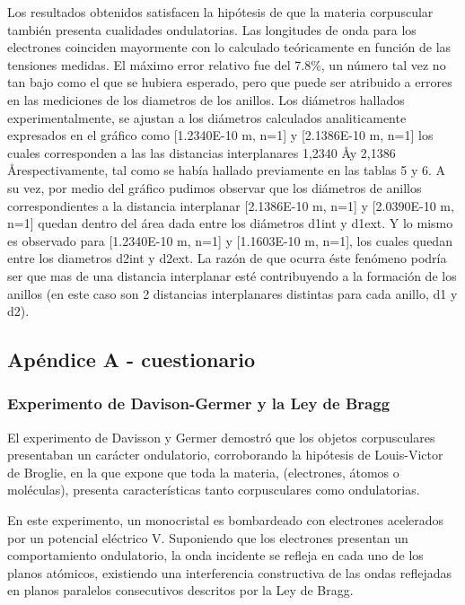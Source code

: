 \documentclass[]{article}
\begin{document}
Los resultados obtenidos satisfacen la hipótesis de que la materia
corpuscular también presenta cualidades ondulatorias. Las longitudes de
onda para los electrones coinciden mayormente con lo calculado teóricamente en
función de las tensiones medidas. El máximo error relativo fue del
7.8\%, un número tal vez no tan bajo como el que se hubiera esperado, pero 
que puede ser atribuido a errores en las mediciones de los diametros de los
anillos. Los diámetros hallados experimentalmente, se ajustan a los 
diámetros calculados analiticamente expresados en el gráfico como 
{[}1.2340E-10 m, n=1{]} y {[}2.1386E-10 m, n=1{]} los cuales corresponden 
a las las distancias interplanares 1,2340 \AA y 2,1386 \AA respectivamente, 
tal como se había hallado previamente en las tablas 5 y 6. 
A su vez, por medio del gráfico pudimos observar que los diámetros de anillos correspondientes a la distancia interplanar {[}2.1386E-10 m, n=1{]} y 
{[}2.0390E-10 m, n=1{]} quedan dentro del área dada entre los diámetros 
d1int y d1ext. Y lo mismo es observado para {[}1.2340E-10 m, n=1{]} y 
{[}1.1603E-10 m, n=1{]}, los cuales quedan entre los diametros 
d2int y d2ext. La razón de que ocurra éste fenómeno podría ser que mas de 
una distancia interplanar esté contribuyendo a la formación de los 
anillos (en este caso son 2 distancias interplanares distintas para cada 
anillo, d1 y d2).

\newpage

\hypertarget{apuxe9ndice-a---cuestionario}{%
\subsection{Apéndice A -
cuestionario}\label{apuxe9ndice-a---cuestionario}}

\hypertarget{experimento-de-davison-germer-y-la-ley-de-bragg}{%
\subsubsection{Experimento de Davison-Germer y la Ley de
Bragg}\label{experimento-de-davison-germer-y-la-ley-de-bragg}}

El experimento de Davisson y Germer demostró que los objetos
corpusculares presentaban un carácter ondulatorio, corroborando la
hipótesis de Louis-Victor de Broglie, en la que expone que toda la
materia, (electrones, átomos o moléculas), presenta características
tanto corpusculares como ondulatorias.

En este experimento, un monocristal es bombardeado con electrones
acelerados por un potencial eléctrico V. Suponiendo que los electrones
presentan un comportamiento ondulatorio, la onda incidente se refleja en
cada uno de los planos atómicos, existiendo una interferencia
constructiva de las ondas reflejadas en planos paralelos consecutivos
descritos por la Ley de Bragg.
\end{document}
